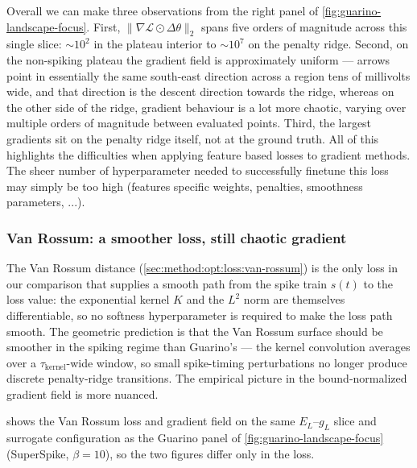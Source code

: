 Overall we can make three observations from the right panel of \cref{fig:guarino-landscape-focus}.
First, $\|\nabla\mathcal{L}\odot\Delta\theta\|_{2}$ spans five orders of magnitude across this single slice: $\sim 10^{2}$ in the plateau interior to $\sim 10^{7}$ on the penalty ridge.
Second, on the non-spiking plateau the gradient field is approximately uniform --- arrows point in essentially the same south-east direction across a region tens of millivolts wide, and that direction is the descent direction towards the ridge, whereas on the other side of the ridge, gradient behaviour is a lot more chaotic, varying over multiple orders of magnitude between evaluated points.
Third, the largest gradients sit on the penalty ridge itself, not at the ground truth.
All of this highlights the difficulties when applying feature based losses to gradient methods.
The sheer number of hyperparameter needed to successfully finetune this loss may simply be too high (features specific weights, penalties, smoothness parameters, ...).

\subsubsection{Van Rossum: a smoother loss, still chaotic gradient}\label{sec:results:landscape:vanrossum}

The Van Rossum distance (\cref{sec:method:opt:loss:van-rossum}) is the only loss in our comparison that supplies a smooth path from the spike train $s(t)$ to the loss value: the exponential kernel $K$ and the $L^{2}$ norm are themselves differentiable, so no softness hyperparameter is required to make the loss path smooth.
The geometric prediction is that the Van Rossum surface should be smoother in the spiking regime than Guarino's --- the kernel convolution averages over a $\tau_{\mathrm{kernel}}$-wide window, so small spike-timing perturbations no longer produce discrete penalty-ridge transitions.
The empirical picture in the bound-normalized gradient field is more nuanced.

 shows the Van Rossum loss and gradient field on the same $E_L$--$g_L$ slice and surrogate configuration as the Guarino panel of \cref{fig:guarino-landscape-focus} (SuperSpike, $\beta=10$), so the two figures differ only in the loss.

